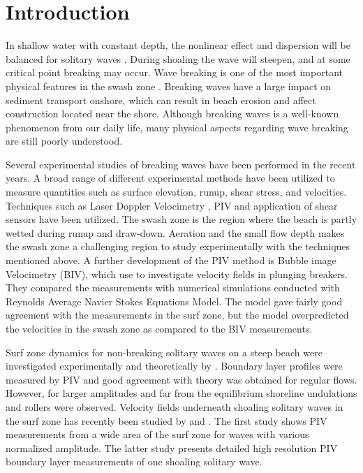 \documentclass[review, authoryear]{elsarticle}
\begin{document}
\section{Introduction}
In shallow water with constant depth, the nonlinear effect and dispersion will be balanced for solitary waves \citep{peregrine1983breaking}. During shoaling the wave will steepen, and at some critical  point breaking may occur. Wave breaking is one of the most important physical features in the swash zone \citep{elfrink2002hydrodynamics}. Breaking waves have a large impact on sediment transport onshore, which can result in beach erosion  and affect construction located near the shore. Although breaking waves is a well-known phenomenon from our daily life, many physical aspects regarding wave breaking are still poorly understood.

 Several experimental studies of breaking waves have been performed in the recent years. A broad range of different experimental methods have been utilized to measure quantities such as surface elevation, runup, shear stress, and velocities. Techniques such as Laser Doppler Velocimetry \citep{petti01}, PIV \citep{cowen03} and application of shear sensors \citep{Barnes09}  have been utilized. The swash zone is  the region where the beach is partly wetted during runup and draw-down. Aeration and the 
small flow depth makes the swash zone a challenging region to study experimentally with the techniques mentioned above. A further development of the PIV method is Bubble image Velocimetry (BIV), which \cite{rivillas2012estimation} use to investigate velocity fields in plunging breakers. They compared the measurements with numerical simulations conducted with Reynolds Average Navier Stokes Equations Model. The   model gave fairly good agreement with the measurements in the surf zone, but the model overpredicted the velocities in the swash zone as compared to the BIV measurements.

Surf zone dynamics for non-breaking solitary waves on a steep beach were investigated experimentally and theoretically by \cite{pedersen2013runup}. Boundary layer profiles were measured by PIV and good agreement with theory was obtained for regular flows. However, for larger amplitudes and far from the equilibrium shoreline
undulations and rollers were observed.
Velocity fields underneath shoaling solitary waves in the surf zone has recently been studied by \cite{lin2014prebreaking} and \cite{lin2015study}. The first study shows PIV measurements from a wide area of the surf zone for waves with various normalized amplitude. The latter study presents detailed high resolution PIV boundary layer measurements of one shoaling solitary wave. 
\end{document}
